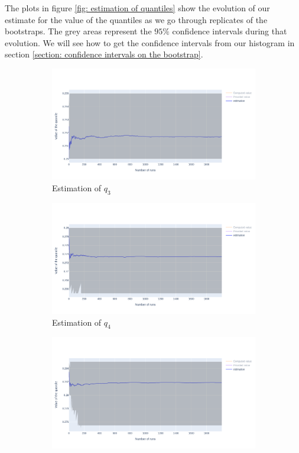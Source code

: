 \documentclass{article}
\begin{document}
The plots in figure \ref{fig: estimation of quantiles} show the evolution of our estimate for the value of the quantiles as we go through replicates of the bootstraps. The grey areas represent the $95\%$ confidence intervals during that evolution. We will see how to get the confidence intervals from our histogram in section \ref{section: confidence intervals on the bootstrap}.

\begin{figure}
    \centering
    \begin{subfigure}{.84\textwidth}
        \includegraphics[width=\textwidth]{images/estimation_q3.png}
        \caption{Estimation of $q_3$}
    \end{subfigure}
    \hfill
    \begin{subfigure}{.84\textwidth}
        \includegraphics[width=\textwidth]{images/estimation_q4.png}
        \caption{Estimation of $q_4$}
    \end{subfigure}
    \hfill
    \begin{subfigure}{.84\textwidth}
        \includegraphics[width=\textwidth]{images/estimation_q5.png}

\end{subfigure}
\end{figure}
\end{document}
